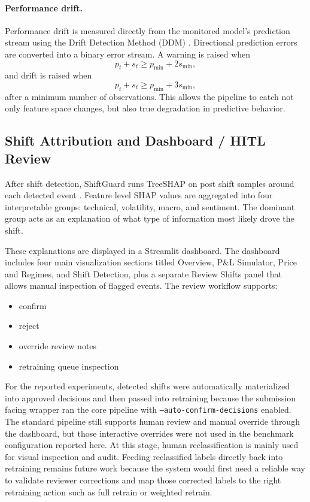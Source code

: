 \documentclass[11pt]{article}
\begin{document}
\paragraph{Performance drift.}
Performance drift is measured directly from the monitored model's prediction stream using the Drift Detection Method (DDM) \cite{gama2004ddm}. Directional prediction errors are converted into a binary error stream. A warning is raised when
\[
p_t + s_t \ge p_{\min} + 2 s_{\min},
\]
and drift is raised when
\[
p_t + s_t \ge p_{\min} + 3 s_{\min},
\]
after a minimum number of observations. This allows the pipeline to catch not only feature space changes, but also true degradation in predictive behavior.

\subsection{Shift Attribution and Dashboard / HITL Review}
After shift detection, ShiftGuard runs TreeSHAP on post shift samples around each detected event \cite{lundberg2017shap}. Feature level SHAP values are aggregated into four interpretable groups: technical, volatility, macro, and sentiment. The dominant group acts as an explanation of what type of information most likely drove the shift.

These explanations are displayed in a Streamlit dashboard. The dashboard includes four main visualization sections titled Overview, P\&L Simulator, Price and Regimes, and Shift Detection, plus a separate Review Shifts panel that allows manual inspection of flagged events. The review workflow supports:
\begin{itemize}
    \item confirm
    \item reject
    \item override review notes
    \item retraining queue inspection
\end{itemize}
For the reported experiments, detected shifts were automatically materialized into approved decisions and then passed into retraining because the submission facing wrapper ran the core pipeline with \texttt{--auto-confirm-decisions} enabled. The standard pipeline still supports human review and manual override through the dashboard, but those interactive overrides were not used in the benchmark configuration reported here. At this stage, human reclassification is mainly used for visual inspection and audit. Feeding reclassified labels directly back into retraining remains future work because the system would first need a reliable way to validate reviewer corrections and map those corrected labels to the right retraining action such as full retrain or weighted retrain.
\end{document}
